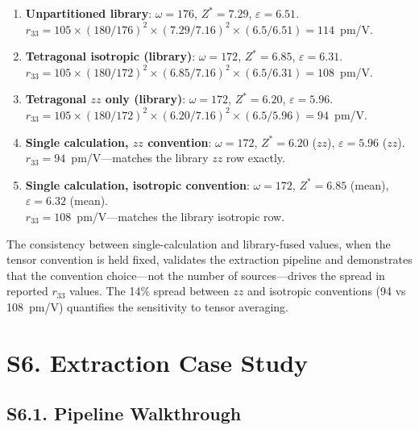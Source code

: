 ﻿\documentclass[prb,onecolumn,superscriptaddress,amsmath,amssymb,longbibliography]{revtex4-2}
\begin{document}
\begin{enumerate}
    \item \textbf{Unpartitioned library}:
    $\omega = 176$, $Z^* = 7.29$, $\varepsilon = 6.51$. \\
    $r_{33} = 105 \times (180/176)^2 \times (7.29/7.16)^2 \times (6.5/6.51)
    = 114$~pm/V.

    \item \textbf{Tetragonal isotropic (library)}:
    $\omega = 172$, $Z^* = 6.85$, $\varepsilon = 6.31$. \\
    $r_{33} = 105 \times (180/172)^2 \times (6.85/7.16)^2 \times (6.5/6.31)
    = 108$~pm/V.

    \item \textbf{Tetragonal $zz$ only (library)}:
    $\omega = 172$, $Z^* = 6.20$, $\varepsilon = 5.96$. \\
    $r_{33} = 105 \times (180/172)^2 \times (6.20/7.16)^2 \times (6.5/5.96)
    = 94$~pm/V.

    \item \textbf{Single calculation, $zz$ convention}:
    $\omega = 172$, $Z^* = 6.20$ ($zz$), $\varepsilon = 5.96$ ($zz$). \\
    $r_{33} = 94$~pm/V---matches the library $zz$ row exactly.

    \item \textbf{Single calculation, isotropic convention}:
    $\omega = 172$, $Z^* = 6.85$ (mean), $\varepsilon = 6.32$ (mean). \\
    $r_{33} = 108$~pm/V---matches the library isotropic row.
\end{enumerate}

The consistency between single-calculation and library-fused values, when
the tensor convention is held fixed, validates the extraction pipeline and
demonstrates that the convention choice---not the number of
sources---drives the spread in reported $r_{33}$ values. The 14\% spread
between $zz$ and isotropic conventions (94 vs 108~pm/V) quantifies the
sensitivity to tensor averaging.



\section{S6. Extraction Case Study}
\label{sec:si_extraction}

\subsection{S6.1. Pipeline Walkthrough}
\end{document}
